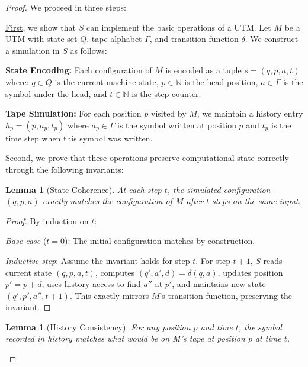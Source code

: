 \documentclass[12pt]{article}
\newtheorem{lemma}[theorem]{Lemma}
\begin{document}
\begin{proof}
We proceed in three steps:

\vspace{0.5em}
\noindent\underline{First}, we show that $S$ can implement the basic operations of a UTM. Let $M$ be a UTM with state set $Q$, tape alphabet $\Gamma$, and transition function $\delta$. We construct a simulation in $S$ as follows:

\vspace{0.5em}
\noindent\textbf{State Encoding:} Each configuration of $M$ is encoded as a tuple $s = (q, p, a, t)$ where: $q \in Q$ is the current machine state, $p \in \mathbb{N}$ is the head position, $a \in \Gamma$ is the symbol under the head, and $t \in \mathbb{N}$ is the step counter.

\vspace{0.5em}
\noindent\textbf{Tape Simulation:} For each position $p$ visited by $M$, we maintain a history entry $h_p = (p, a_p, t_p)$ where $a_p \in \Gamma$ is the symbol written at position $p$ and $t_p$ is the time step when this symbol was written.

\vspace{0.5em}
\noindent\underline{Second}, we prove that these operations preserve computational state correctly through the following invariants:

\begin{lemma}[State Coherence]
At each step $t$, the simulated configuration $(q, p, a)$ exactly matches the configuration of $M$ after $t$ steps on the same input.
\end{lemma}

\begin{proof}
By induction on $t$:

\vspace{0.3em}
\noindent\textit{Base case} ($t=0$): The initial configuration matches by construction.

\vspace{0.3em}
\noindent\textit{Inductive step}: Assume the invariant holds for step $t$. 
For step $t+1$, $S$ reads current state $(q, p, a, t)$, computes $(q', a', d) = \delta(q, a)$, updates position $p' = p + d$, uses history access to find $a''$ at $p'$, and maintains new state $(q', p', a'', t+1)$.
This exactly mirrors $M$'s transition function, preserving the invariant.
\end{proof}

\begin{lemma}[History Consistency]
For any position $p$ and time $t$, the symbol recorded in history matches what would be on $M$'s tape at position $p$ at time $t$.
\end{lemma}


\end{proof}
\end{document}
